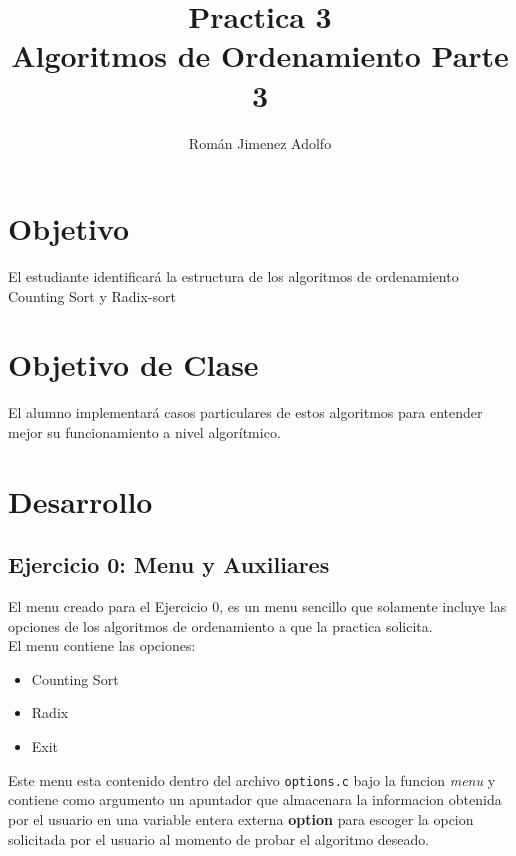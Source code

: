 \documentclass{article}
\title
{
	Practica 3\\
	Algoritmos de Ordenamiento Parte 3
}
\author
{
	Román Jimenez Adolfo
}
\begin{document}
	
	
	
	\maketitle
	
	\section{Objetivo}
		
		El estudiante identificará la estructura de los algoritmos de ordenamiento Counting Sort y Radix-sort
	
	\section{Objetivo de Clase}
		
		El alumno implementará casos particulares de estos algoritmos para entender mejor su funcionamiento a nivel algorítmico.
		
	\newpage
		
	\section{Desarrollo}
		\subsection{Ejercicio 0: Menu y Auxiliares}
		
			El menu creado para el Ejercicio 0, es un menu sencillo que solamente incluye las opciones de los algoritmos de ordenamiento a que la practica solicita.\\
			
			El menu contiene las opciones:
			
			\begin{itemize}
				\item Counting Sort
				\item Radix
				\item Exit
			\end{itemize}
			
			Este menu esta contenido dentro del archivo \verb|options.c| bajo la funcion \emph{menu} y contiene como argumento un apuntador que almacenara la informacion obtenida por el usuario en una variable entera externa \textbf{option} para escoger la opcion solicitada por el usuario al momento de probar el algoritmo deseado.\\
			
\end{document}
